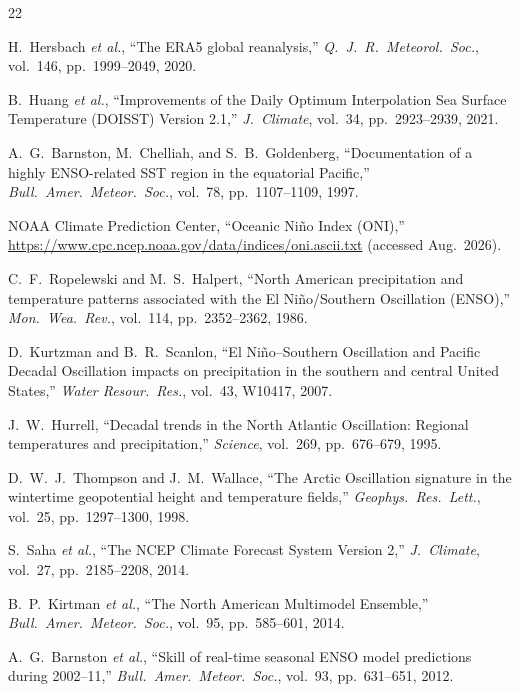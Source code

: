 \documentclass{article}
\begin{document}
{\small
\begin{thebibliography}{22}

H.~Hersbach \emph{et al.}, ``The ERA5 global reanalysis,'' \emph{Q.\ J.\ R.\ Meteorol.\ Soc.}, vol.~146, pp.~1999--2049, 2020.

B.~Huang \emph{et al.}, ``Improvements of the Daily Optimum Interpolation Sea Surface Temperature (DOISST) Version 2.1,'' \emph{J.\ Climate}, vol.~34, pp.~2923--2939, 2021.

A.~G.~Barnston, M.~Chelliah, and S.~B.~Goldenberg, ``Documentation of a highly ENSO-related SST region in the equatorial Pacific,'' \emph{Bull.\ Amer.\ Meteor.\ Soc.}, vol.~78, pp.~1107--1109, 1997.

NOAA Climate Prediction Center, ``Oceanic Ni\~{n}o Index (ONI),''
\url{https://www.cpc.ncep.noaa.gov/data/indices/oni.ascii.txt}
(accessed Aug.\ 2026).

C.~F.~Ropelewski and M.~S.~Halpert, ``North American precipitation and temperature patterns associated with the El Ni\~{n}o/Southern Oscillation (ENSO),'' \emph{Mon.\ Wea.\ Rev.}, vol.~114, pp.~2352--2362, 1986.

D.~Kurtzman and B.~R.~Scanlon, ``El Ni\~{n}o--Southern Oscillation and Pacific Decadal Oscillation impacts on precipitation in the southern and central United States,'' \emph{Water Resour.\ Res.}, vol.~43, W10417, 2007.

J.~W.~Hurrell, ``Decadal trends in the North Atlantic Oscillation: Regional temperatures and precipitation,'' \emph{Science}, vol.~269, pp.~676--679, 1995.

D.~W.~J.~Thompson and J.~M.~Wallace, ``The Arctic Oscillation signature in the wintertime geopotential height and temperature fields,'' \emph{Geophys.\ Res.\ Lett.}, vol.~25, pp.~1297--1300, 1998.

S.~Saha \emph{et al.}, ``The NCEP Climate Forecast System Version 2,'' \emph{J.\ Climate}, vol.~27, pp.~2185--2208, 2014.

B.~P.~Kirtman \emph{et al.}, ``The North American Multimodel Ensemble,'' \emph{Bull.\ Amer.\ Meteor.\ Soc.}, vol.~95, pp.~585--601, 2014.

A.~G.~Barnston \emph{et al.}, ``Skill of real-time seasonal ENSO model predictions during 2002--11,'' \emph{Bull.\ Amer.\ Meteor.\ Soc.}, vol.~93, pp.~631--651, 2012.


\end{thebibliography}}
\end{document}
